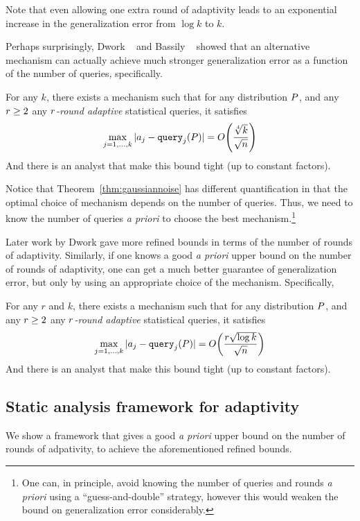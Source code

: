 Note that even allowing one extra round of adaptivity leads to an exponential increase in the generalization error from $\log k$ to $k$.

Perhaps surprisingly, Dwork \etal~\cite{DworkFHPRR15} and Bassily \etal~\cite{BassilyNSSSU16} showed that an alternative mechanism can actually achieve much stronger generalization error as a function of the number of queries, specifically.
\begin{thm} \label{thm:gaussiannoise} For any $k$, there exists a mechanism such that for any distribution $P$, and any $r \geq 2$ any \emph{$r$-round adaptive} statistical queries, it satisfies
$$
\max_{j=1,\dots,k} | \answer_j - \query_j(\dist) | = O\left( \frac{\sqrt[4]{k}}{\sqrt{n}}  \right)
$$
And there is an analyst that make this bound tight (up to constant factors).
\end{thm}
Notice that Theorem~\ref{thm:gaussiannoise} has different quantification in that the optimal choice of mechanism depends on the number of queries.  Thus, we need to know the number of queries \emph{a priori} to choose the best mechanism.\footnote{ \label{fn1} One can, in principle, avoid knowing the number of queries and rounds \emph{a priori} using a ``guess-and-double'' strategy, however this would weaken the bound on generalization error considerably.}

Later work by Dwork 
gave more refined bounds in terms of the number of rounds of adaptivity.  Similarly, if one knows a good \emph{a priori} upper bound on the number of rounds of adaptivity, one can get a much better guarantee of generalization error, but only by using an appropriate choice of the mechanism. %
Specifically, 
\begin{thm} \label{thm:gaussiannoise2} For any $r$ and $k$, there exists a mechanism such that for any distribution $P$, and any $r \geq 2$ any \emph{$r$-round adaptive} statistical queries, it satisfies
$$
\max_{j=1,\dots,k} | \answer_j - \query_j(\dist) | = O\left( \frac{r \sqrt{\log k}}{\sqrt{n}}  \right)
$$
And there is an analyst that make this bound tight (up to constant factors).
\end{thm}


\subsection{Static analysis framework for adaptivity}
We show a framework that gives a good \emph{a priori} upper bound on the number of rounds of adpativity, to achieve the aforementioned refined bounds.  

